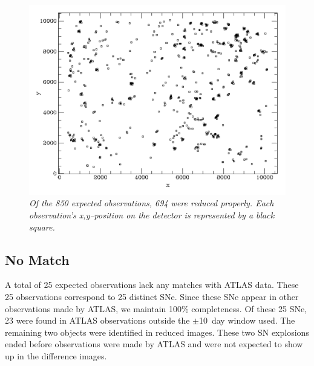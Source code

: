 \begin{figure}[h!]%
 \begin{center}
    \includegraphics[width=1\linewidth]{figures/plotxy_694_good_obs.png}%
     \caption{\it \small{Of the 850 expected observations, 694 were reduced properly.  Each observation's x,y--position on the detector is represented by a black square.~\label{fig:xy}}}%
  \end{center}%
\end{figure}



\subsection{No Match}\label{sec:nomatch}
A total of 25 expected observations lack any matches with ATLAS data.  These 25 
observations correspond to 25 distinct SNe.  Since these SNe appear in other 
observations made by ATLAS, we maintain 100\% completeness.  Of these 25 SNe, 23 
were found in ATLAS observations outside the $\pm$10~day window used.  
%
The remaining two objects were identified in reduced images.  These two SN explosions 
ended before observations were made by ATLAS and were not expected to show up in the 
difference images.



